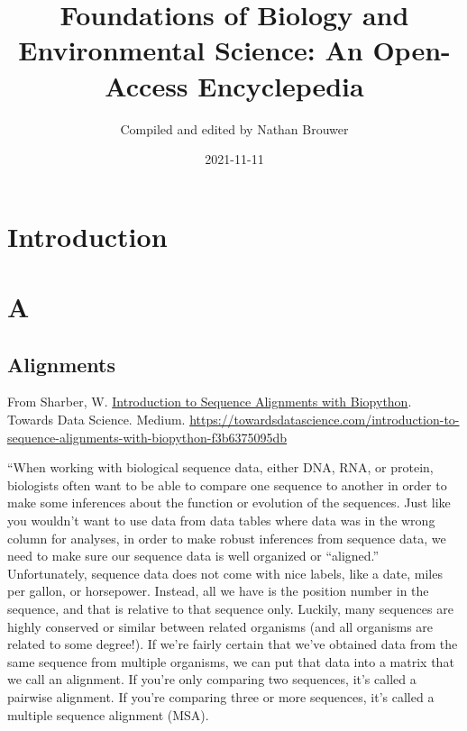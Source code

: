 \documentclass[
]{book}
\title{Foundations of Biology and Environmental Science: An Open-Access Encyclepedia}
\author{Compiled and edited by Nathan Brouwer}
\date{2021-11-11}
\begin{document}
\maketitle

{
\setcounter{tocdepth}{1}
\tableofcontents
}
\hypertarget{introduction}{%
\chapter{Introduction}\label{introduction}}

\hypertarget{a}{%
\chapter{A}\label{a}}

\hypertarget{alignments}{%
\section{Alignments}\label{alignments}}

From Sharber, W. \href{https://towardsdatascience.com/introduction-to-sequence-alignments-with-biopython-f3b6375095db}{Introduction to Sequence Alignments with Biopython}. Towards Data Science. Medium.
\url{https://towardsdatascience.com/introduction-to-sequence-alignments-with-biopython-f3b6375095db}

``When working with biological sequence data, either DNA, RNA, or protein, biologists often want to be able to compare one sequence to another in order to make some inferences about the function or evolution of the sequences. Just like you wouldn't want to use data from data tables where data was in the wrong column for analyses, in order to make robust inferences from sequence data, we need to make sure our sequence data is well organized or ``aligned.'' Unfortunately, sequence data does not come with nice labels, like a date, miles per gallon, or horsepower. Instead, all we have is the position number in the sequence, and that is relative to that sequence only. Luckily, many sequences are highly conserved or similar between related organisms (and all organisms are related to some degree!). If we're fairly certain that we've obtained data from the same sequence from multiple organisms, we can put that data into a matrix that we call an alignment. If you're only comparing two sequences, it's called a pairwise alignment. If you're comparing three or more sequences, it's called a multiple sequence alignment (MSA).
\end{document}
